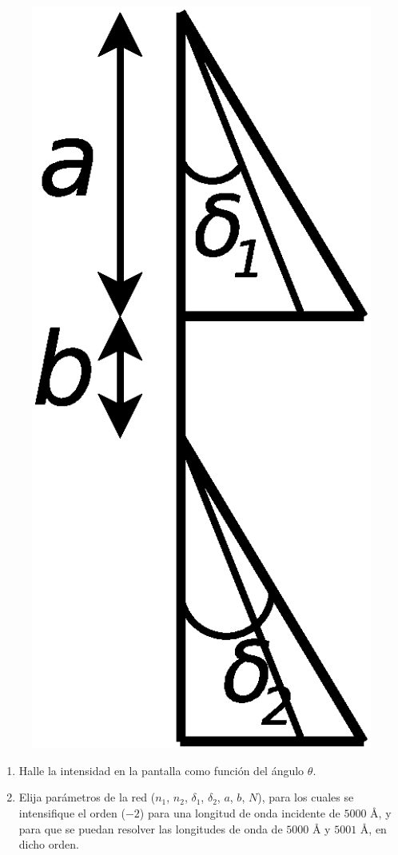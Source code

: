 \documentclass[11pt,spanish]{article}
\begin{document}
\begin{enumerate}
    \begin{figure}[H]
        \centering{}
        \includegraphics[clip,scale=0.3]{figs/ej5-46}
    \end{figure}

    \begin{enumerate}
        \item Halle la intensidad en la pantalla como función del ángulo $\theta$. 
        \item Elija parámetros de la red ($n_{1}$, $n_{2}$, $\delta_{1}$, $\delta_{2}$,
        $a$, $b$, $N$), para los cuales se intensifique el orden ($-2$)
        para una longitud de onda incidente de $5000$ Å, y para que se puedan
        resolver las longitudes de onda de $5000$ Å y $5001$ Å, en dicho orden.
    \end{enumerate}


\end{enumerate}
\end{document}
